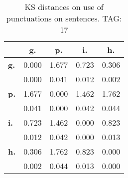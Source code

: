 \begin{table}[h!]
\begin{center}
\begin{tabular}{| l || c | c | c | c |}\hline
 & {\bf g.} & {\bf p.} & {\bf i.} & {\bf h.} \\\hline\hline
{\bf g.} & 0.000 & 1.677 & 0.723 & 0.306 \\
{\bf } & 0.000 & 0.041 & 0.012 & 0.002 \\\hline
{\bf p.} & 1.677 & 0.000 & 1.462 & 1.762 \\
{\bf } & 0.041 & 0.000 & 0.042 & 0.044 \\\hline
{\bf i.} & 0.723 & 1.462 & 0.000 & 0.823 \\
{\bf } & 0.012 & 0.042 & 0.000 & 0.013 \\\hline
{\bf h.} & 0.306 & 1.762 & 0.823 & 0.000 \\
{\bf } & 0.002 & 0.044 & 0.013 & 0.000 \\\hline
\end{tabular}
\caption{KS distances on use of punctuations on sentences. TAG: 17}
\end{center}
\end{table}